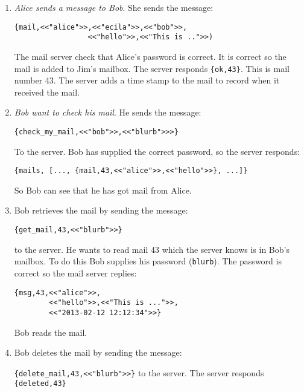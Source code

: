 \documentclass[12pt]{hitec}
\begin{document}
\begin{enumerate}

\item {\sl Alice sends a message to Bob}. She sends the message:

\begin{verbatim}
{mail,<<"alice">>,<<"ecila">>,<<"bob">>,
                 <<"hello">>,<<"This is ..">>)
\end{verbatim}

The mail server check that Alice's password is correct. It is correct so the
mail is added to Jim's mailbox. The server responds \verb+{ok,43}+. This is mail
number 43. The server adds a time stamp to the mail to record when it received
the mail.

\item {\sl Bob want to check his mail}. He sends the message:
 
\verb+{check_my_mail,<<"bob">>,<<"blurb">>>}+

To the server. Bob has supplied the correct password, so the server responds:

\verb+{mails, [..., {mail,43,<<"alice">>,<<"hello">>}, ...]}+

So Bob can see that he has got mail from Alice. 

\item Bob retrieves the mail by sending the message:

\verb+{get_mail,43,<<"blurb">>}+ 

to the server. He wants to read mail 43 
which the server knows is in Bob's mailbox. To do this Bob supplies his password
(\verb+blurb+). The password is correct so the mail server replies:

\begin{verbatim}
{msg,43,<<"alice">>,
        <<"hello">>,<<"This is ...">>,
        <<"2013-02-12 12:12:34">>}
\end{verbatim}



Bob reads the mail.

\item Bob deletes the mail by sending the message:

\verb+{delete_mail,43,<<"blurb">>}+ to the server. The server responds
\verb+{deleted,43}+

\end{enumerate}
\end{document}
